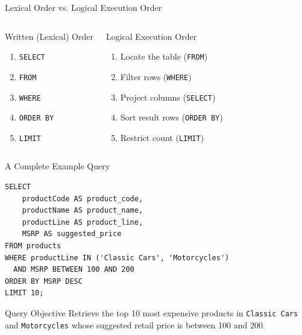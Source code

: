\documentclass[aspectratio=169,11pt]{beamer}
\newcommand{\kw}[1]{\textcolor{sqlblue}{\texttt{#1}}}
\begin{document}
\begin{frame}{Lexical Order vs. Logical Execution Order}
\begin{columns}[T]
\begin{block}{Written (Lexical) Order}
\begin{enumerate}
  \item \kw{SELECT}
  \item \kw{FROM}
  \item \kw{WHERE}
  \item \kw{ORDER BY}
  \item \kw{LIMIT}
\end{enumerate}
\end{block}
\begin{block}{Logical Execution Order}
\begin{enumerate}
  \item Locate the table (\kw{FROM})
  \item Filter rows (\kw{WHERE})
  \item Project columns (\kw{SELECT})
  \item Sort result rows (\kw{ORDER BY})
  \item Restrict count (\kw{LIMIT})
\end{enumerate}
\end{block}
\end{columns}
\end{frame}

\begin{frame}[fragile]{A Complete Example Query}
\begin{lstlisting}
SELECT
    productCode AS product_code,
    productName AS product_name,
    productLine AS product_line,
    MSRP AS suggested_price
FROM products
WHERE productLine IN ('Classic Cars', 'Motorcycles')
  AND MSRP BETWEEN 100 AND 200
ORDER BY MSRP DESC
LIMIT 10;
\end{lstlisting}
\begin{block}{Query Objective}
Retrieve the top 10 most expensive products in \texttt{Classic Cars} and \texttt{Motorcycles} whose suggested retail price is between 100 and 200.
\end{block}
\end{frame}
\end{document}
